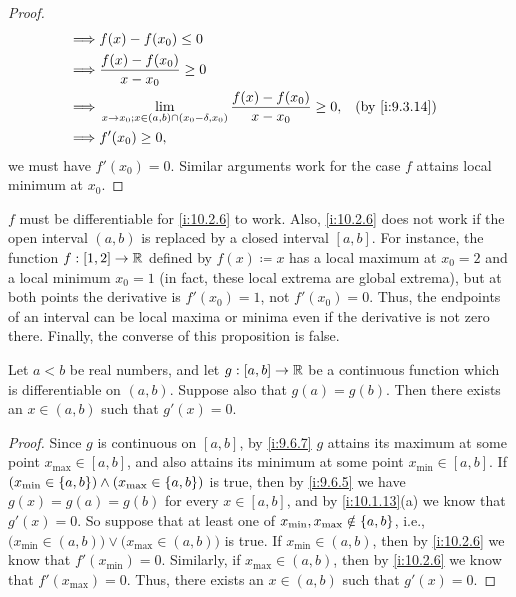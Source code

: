 \begin{proof}
\begin{align*}
    \implies & f(x) - f(x_0) \leq 0                                                                                               \\
    \implies & \dfrac{f(x) - f(x_0)}{x - x_0} \geq 0                                                                              \\
    \implies & \lim_{x \to x_0 ; x \in (a, b) \cap (x_0 - \delta, x_0)} \dfrac{f(x) - f(x_0)}{x - x_0} \geq 0, &  & \by{i:9.3.14} \\
    \implies & f'(x_0) \geq 0,
  \end{align*}
  we must have \(f'(x_0) = 0\).
  Similar arguments work for the case \(f\) attains local minimum at \(x_0\).
\end{proof}

\begin{note}
  \(f\) must be differentiable for \cref{i:10.2.6} to work.
  Also, \cref{i:10.2.6} does not work if the open interval \((a, b)\) is replaced by a closed interval \([a, b]\).
  For instance, the function \(f : [1, 2] \to \mathbb{R}\) defined by \(f(x) \coloneqq x\) has a local maximum at \(x_0 = 2\) and a local minimum \(x_0 = 1\) (in fact, these local extrema are global extrema), but at both points the derivative is \(f'(x_0) = 1\), not \(f'(x_0) = 0\).
  Thus, the endpoints of an interval can be local maxima or minima even if the derivative is not zero there.
  Finally, the converse of this proposition is false.
\end{note}

\begin{thm}\label{i:10.2.7}
  Let \(a < b\) be real numbers, and let \(g : [a, b] \to \mathbb{R}\) be a continuous function which is differentiable on \((a, b)\).
  Suppose also that \(g(a) = g(b)\).
  Then there exists an \(x \in (a, b)\) such that \(g'(x) = 0\).
\end{thm}

\begin{proof}
  Since \(g\) is continuous on \([a, b]\), by \cref{i:9.6.7} \(g\) attains its maximum at some point \(x_{\max} \in [a, b]\), and also attains its minimum at some point \(x_{\min} \in [a, b]\).
  If \((x_{\min} \in \left\lbrace a, b\right\rbrace) \land (x_{\max} \in \left\lbrace a, b\right\rbrace)\) is true, then by \cref{i:9.6.5} we have \(g(x) = g(a) = g(b)\) for every \(x \in [a, b]\), and by \cref{i:10.1.13}(a) we know that \(g'(x) = 0\).
  So suppose that at least one of \(x_{\min}, x_{\max} \notin \left\lbrace a, b\right\rbrace\), i.e., \(\big(x_{\min} \in (a, b)\big) \lor \big(x_{\max} \in (a, b)\big)\) is true.
  If \(x_{\min} \in (a, b)\), then by \cref{i:10.2.6} we know that \(f'(x_{\min}) = 0\).
  Similarly, if \(x_{\max} \in (a, b)\), then by \cref{i:10.2.6} we know that \(f'(x_{\max}) = 0\).
  Thus, there exists an \(x \in (a, b)\) such that \(g'(x) = 0\).
\end{proof}

